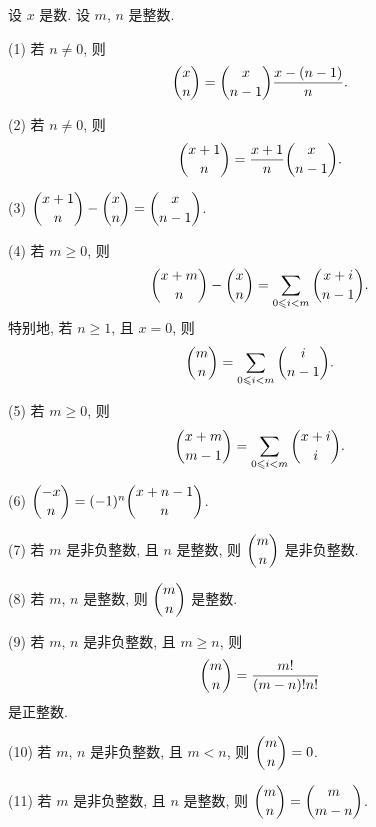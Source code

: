 \documentclass[../libro.tex]{subfiles}
\begin{document}
\begin{theorem}
    设 \(x\) 是数.
    设 \(m\), \(n\) 是整数.

    (1)
    若 \(n \neq 0\), 则
    \begin{align*}
        \dbinom{x}{n} = \dbinom{x}{n-1} \frac{x-(n-1)}{n}.
    \end{align*}

    (2)
    若 \(n \neq 0\), 则
    \begin{align*}
        \dbinom{x+1}{n} = \frac{x+1}{n} \dbinom{x}{n-1}.
    \end{align*}

    (3)
    \(\dbinom{x+1}{n} - \dbinom{x}{n} = \dbinom{x}{n-1}\).

    (4)
    若 \(m \geq 0\), 则
    \begin{align*}
        \dbinom{x + m}{n} - \dbinom{x}{n}
        = \sum_{0 \leq i < m} {\dbinom{x + i}{n-1}}.
    \end{align*}
    特别地, 若 \(n \geq 1\), 且 \(x = 0\), 则
    \begin{align*}
        \dbinom{m}{n} = \sum_{0 \leq i < m} {\dbinom{i}{n-1}}.
    \end{align*}

    (5)
    若 \(m \geq 0\), 则
    \begin{align*}
        \dbinom{x + m}{m-1}
        = \sum_{0 \leq i < m} {\dbinom{x + i}{i}}.
    \end{align*}

    (6)
    \(\dbinom{-x}{n} = (-1)^n \dbinom{x + n - 1}{n}\).

    (7)
    若 \(m\) 是非负整数, 且 \(n\) 是整数,
    则 \(\dbinom{m}{n}\) 是非负整数.

    (8)
    若 \(m\), \(n\) 是整数,
    则 \(\dbinom{m}{n}\) 是整数.

    (9)
    若 \(m\), \(n\) 是非负整数, 且 \(m \geq n\),
    则
    \begin{align*}
        \dbinom{m}{n} = \frac{m!}{(m - n)! n!}
    \end{align*}
    是正整数.

    (10)
    若 \(m\), \(n\) 是非负整数, 且 \(m < n\),
    则 \(\dbinom{m}{n} = 0\).

    (11)
    若 \(m\) 是非负整数, 且 \(n\) 是整数,
    则 \(\dbinom{m}{n} = \dbinom{m}{m - n}\).
\end{theorem}
\end{document}

